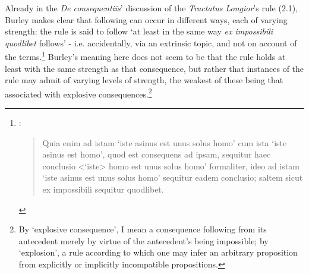 \documentclass[]{birkjour}
\begin{document}
Already in the \textit{De consequentiis}' discussion of the \textit{Tractatus Longior}'s rule (2.1), Burley makes clear that following can occur in different ways, each of varying strength: the rule is said to follow `at least in the same way \textit{ex impossibili quodlibet} follows' - i.e. accidentally, via an extrinsic topic, and not on account of the terms.\footnote{\autocite[p. 132, par. 85]{Green-Pedersen1980b}: \begin{quote}
		Quia enim ad istam `iste asinus est unus solus homo' cum ista `iste asinus est homo', quod est consequens ad ipsam, sequitur haec conclusio <`iste> homo est unus solus homo' formaliter, ideo ad istam `iste asinus est unus solus homo' sequitur eadem conclusio; saltem sicut ex impossibili sequitur quodlibet.
	\end{quote}} Burley's meaning here does not seem to be that the rule holds at least with the same strength as that consequence, but rather that instances of the rule may admit of varying levels of strength, the weakest of these being that associated with explosive consequences.\footnote{By `explosive consequence', I mean a consequence following from its antecedent merely by virtue of the antecedent's being impossible; by `explosion', a rule according to which one may infer an arbitrary proposition from explicitly or implicitly incompatible propositions.} 

	
\end{document}
